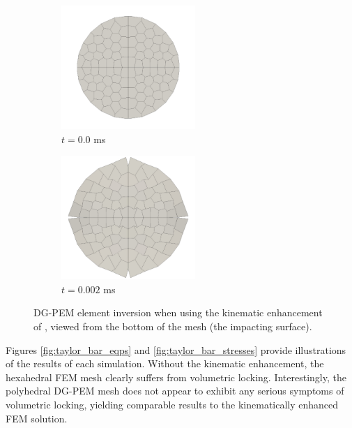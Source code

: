 \begin{figure}[!h]
  \centering
    \begin{subfigure}[b]{0.49\linewidth}
            \centering
            \includegraphics[width=2.0in]{figures/before_distortion.pdf}
    			\caption{$t = 0.0$ ms \label{fig:before_distortion}}
    \end{subfigure}
	\begin{subfigure}[b]{0.49\linewidth}
            \centering
            \includegraphics[width=2.0in]{figures/after_distortion.pdf}
    			\caption{$t = 0.002$ ms \label{fig:after_distortion}}
    \end{subfigure} \caption{DG-PEM element inversion when using the kinematic enhancement of \cite{Rashid:06}, viewed from the bottom of the mesh (the impacting surface).}
  \label{fig:element_inversion}
\end{figure}

Figures \ref{fig:taylor_bar_eqps} and \ref{fig:taylor_bar_stresses} provide illustrations of the results of each simulation. Without the kinematic enhancement, the hexahedral FEM mesh clearly suffers from volumetric locking. Interestingly, the polyhedral DG-PEM mesh does not appear to exhibit any serious symptoms of volumetric locking, yielding comparable results to the kinematically enhanced FEM solution.

